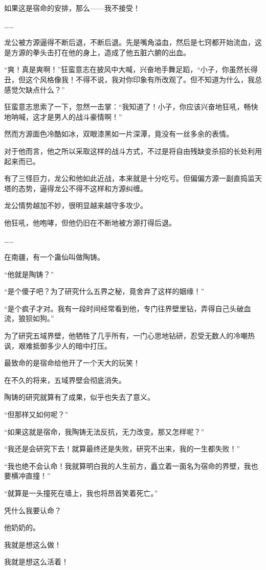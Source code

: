 \begin{this_body}
如果这是宿命的安排，那么——我不接受！

……

龙公被方源逼得不断后退，不断后退。先是嘴角溢血，然后是七窍都开始流血，这是方源的拳头击打在他的身上，造成了他五脏六腑的出血。

“爽！真是爽啊！”狂蛮意志在披风中大喊，兴奋地手舞足蹈，“小子，你虽然长得丑，但这个风格像我！不得不说，我对你印象有所改观了。但不知道为什么，我总感觉欠缺点什么？”

狂蛮意志思索了一下，忽然一击掌：“我知道了！小子，你应该兴奋地狂吼，畅快地呐喊，这才是男人的战斗豪情啊！”

然而方源面色冷酷如冰，双眼漆黑如一片深潭，竟没有一丝多余的表情。

对于他而言，他之所以采取这样的战斗方式，不过是将自由残缺变杀招的长处利用起来而已。

有了三怪巨力，龙公和他如此近战，本来就是十分吃亏。但偏偏方源一副直捣监天塔的态势，逼得龙公不得不这样和方源纠缠。

龙公情势越加不妙，很明显越来越守多攻少。

他狂吼，他咆哮，但他仍旧在不断地被方源打得后退。

……

在南疆，有一个蛊仙叫做陶铸。

“他就是陶铸？”

“是个傻子吧？为了研究什么五界之秘，竟舍弃了这样的姻缘！”

“是个疯子才对。我有一段时间经常看到他，专门往界壁里钻，弄得自己头破血流，狼狈如狗。”

为了研究五域界壁，他牺牲了几乎所有，一门心思地钻研，忍受无数人的冷嘲热讽，艰难抵御多少人的暗中打压。

最致命的是宿命给他开了一个天大的玩笑！

在不久的将来，五域界壁会彻底消失。

陶铸的研究就算有了成果，似乎也失去了意义。

“但那样又如何呢？”

“如果这就是宿命，我陶铸无法反抗，无力改变。那又怎样呢？”

“我还是会研究下去！就算最终还是失败，研究不出来，我的一生都失败！”

“我也绝不会认命！我就算明白我的人生前方，矗立着一面名为宿命的界壁，我也要横冲直撞！”

“就算是一头撞死在墙上，我也将昂首笑着死亡。”

凭什么我要认命？

他奶奶的。

我就是想这么做！

我就是想这么活着！

\end{this_body}


